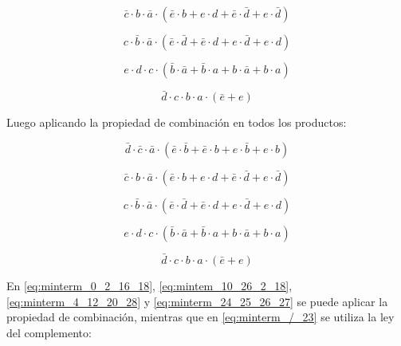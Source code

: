 \begin{equation}\label{eq:mintem_10_26_2_18}
\bar{c} \cdot b \cdot \bar{a} \cdot (\bar{e} \cdot b + e 	\cdot d + \bar{e} \cdot \bar{d} + e \cdot \bar{d})
\end{equation}

\begin{equation}\label{eq:minterm_4_12_20_28}
c \cdot \bar{b} \cdot \bar{a} \cdot (\bar{e} \cdot \bar{d} + \bar{e} \cdot d + e \cdot \bar{d} + e \cdot d)
\end{equation}

\begin{equation}\label{eq:minterm_24_25_26_27}
e \cdot d \cdot c \cdot (\bar{b} \cdot \bar{a} + \bar{b} \cdot a + b \cdot \bar{a} + b \cdot a)
\end{equation}

\begin{equation}\label{eq:minterm_/_23}
\bar{d} \cdot c \cdot b \cdot a \cdot (\bar{e} + e)
\end{equation}

Luego aplicando la propiedad de combinación en todos los productos:

\begin{equation}\label{eq:minterm_0_2_16_18}
\bar{d} \cdot \bar{c} \cdot \bar{a} \cdot (\bar{e} \cdot \bar{b} + \bar{e} \cdot b + e \cdot \bar{b} + e \cdot b)
\end{equation}

\begin{equation}\label{eq:mintem_10_26_2_18}
\bar{c} \cdot b \cdot \bar{a} \cdot (\bar{e} \cdot b + e 	\cdot d + \bar{e} \cdot \bar{d} + e \cdot \bar{d})
\end{equation}

\begin{equation}\label{eq:minterm_4_12_20_28}
c \cdot \bar{b} \cdot \bar{a} \cdot (\bar{e} \cdot \bar{d} + \bar{e} \cdot d + e \cdot \bar{d} + e \cdot d)
\end{equation}

\begin{equation}\label{eq:minterm_24_25_26_27}
e \cdot d \cdot c \cdot (\bar{b} \cdot \bar{a} + \bar{b} \cdot a + b \cdot \bar{a} + b \cdot a)
\end{equation}

\begin{equation}\label{eq:minterm_7_23}
\bar{d} \cdot c \cdot b \cdot a \cdot (\bar{e} + e)
\end{equation}


En \ref{eq:minterm_0_2_16_18}, \ref{eq:mintem_10_26_2_18}, \ref{eq:minterm_4_12_20_28} y \ref{eq:minterm_24_25_26_27} se puede aplicar la propiedad de combinación, mientras que en \ref{eq:minterm_/_23} se utiliza la ley del complemento:


